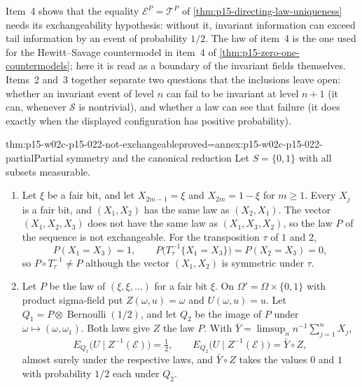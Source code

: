 Item~4 shows that the equality \(\mathcal E^{P}=\mathcal T^{P}\) of
\cref{thm:p15-directing-law-uniqueness} needs its exchangeability
hypothesis: without it, invariant information can exceed tail
information by an event of probability \(1/2\). The law of item~4 is the
one used for the Hewitt--Savage countermodel in item~4 of
\cref{thm:p15-zero-one-countermodels}; here it is read as a boundary of
the invariant fields themselves. Items~2 and~3 together separate two
questions that the inclusions leave open: whether an invariant event of
level \(n\) can fail to be invariant at level \(n+1\) (it can, whenever
\(\mathcal S\) is nontrivial), and whether a law can see that failure
(it does exactly when the displayed configuration has positive
probability).

\begin{hbtheorem}{thm:p15-w02c-p15-022-not-exchangeable}{proved=annex:p15-w02c-p15-022-partial}{Partial symmetry and the canonical reduction}
Let \(S=\{0,1\}\) with all subsets measurable.
\begin{enumerate}
\item Let \(\xi\) be a fair bit, and let \(X_{2m-1}=\xi\) and
      \(X_{2m}=1-\xi\) for \(m\geq1\). Every \(X_j\) is a fair bit, and
      \((X_1,X_2)\) has the same law as \((X_2,X_1)\). The vector
      \((X_1,X_2,X_3)\) does not have the same law as
      \((X_1,X_3,X_2)\), so the law \(P\) of the sequence is not
      exchangeable. For the transposition \(\tau\) of \(1\) and \(2\),
      \[
       P(X_1=X_3)=1,\qquad
       P\bigl(T_\tau^{-1}\{X_1=X_3\}\bigr)=P(X_2=X_3)=0,
      \]
      so \(P\circ T_\tau^{-1}\neq P\) although the vector \((X_1,X_2)\)
      is symmetric under \(\tau\).
\item Let \(P\) be the law of \((\xi,\xi,\ldots)\) for a fair bit
      \(\xi\). On \(\Omega'=\Omega\times\{0,1\}\) with product
      sigma-field put \(Z(\omega,u)=\omega\) and \(U(\omega,u)=u\). Let
      \(Q_1=P\otimes\operatorname{Bernoulli}(1/2)\), and let \(Q_2\) be
      the image of \(P\) under \(\omega\mapsto(\omega,\omega_1)\). Both
      laws give \(Z\) the law \(P\). With
      \(\bar Y=\limsup_nn^{-1}\sum_{j=1}^nX_j\),
      \[
       E_{Q_1}\bigl(U\mid Z^{-1}(\mathcal E)\bigr)=\tfrac12,
       \qquad
       E_{Q_2}\bigl(U\mid Z^{-1}(\mathcal E)\bigr)=\bar Y\circ Z,
      \]
      almost surely under the respective laws, and \(\bar Y\circ Z\)
      takes the values \(0\) and \(1\) with probability \(1/2\) each
      under \(Q_2\).
\end{enumerate}
\end{hbtheorem}

